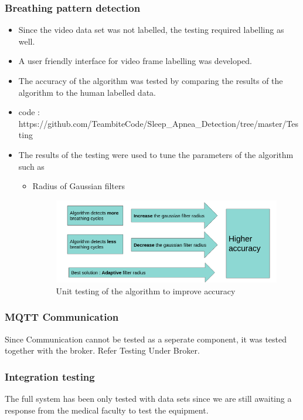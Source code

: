 \documentclass{report}
\begin{document}
\subsubsection{Breathing pattern detection} 
\begin{itemize}
    \item Since the video data set was not labelled, the testing required labelling as well.
    \item A user friendly interface for video frame labelling was developed.
    \item The accuracy of the algorithm was tested by comparing the results of the algorithm to the human labelled data.
    \item code : https://github.com/TeambiteCode/Sleep\_Apnea\_Detection/tree/master/Testing
    \item The results of the testing were used to tune the parameters of the algorithm such as
    \begin{itemize}
        \item Radius of Gaussian filters\\
        \begin{figure}[H]
            \centering
            \includegraphics[scale=0.6]{unitTesting.png}
            \caption{Unit testing of the algorithm to improve accuracy}
            \label{fig:Unit testing of the algorithm to improve accuracy}
        \end{figure}
    \end{itemize}
\end{itemize}


\subsubsection{MQTT Communication} %
Since Communication cannot be tested as a seperate component, it was tested together with the broker. Refer Testing Under Broker.

\subsubsection{Integration testing}
The full system has been only tested with data sets since we are still awaiting a response from the medical faculty to test the equipment.
\end{document}
